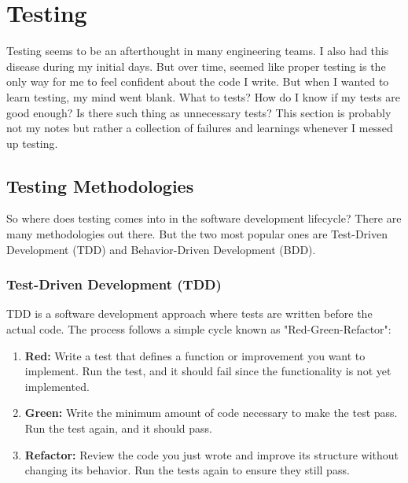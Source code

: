 \section{Testing}
Testing seems to be an afterthought in many engineering teams. I also had this disease during my initial days. But over time, seemed like proper testing is the only way for me to feel confident about the code I write. But when I wanted to learn testing, my mind went blank. What to tests? How do I know if my tests are good enough? Is there such thing as unnecessary tests? This section is probably not my notes but rather a collection of failures and learnings whenever I messed up testing.

\subsection{Testing Methodologies}
So where does testing comes into in the software development lifecycle? There are many methodologies out there. But the two most popular ones are Test-Driven Development (TDD) and Behavior-Driven Development (BDD). 

\subsubsection{Test-Driven Development (TDD)}
TDD is a software development approach where tests are written before the actual code. The process follows a simple cycle known as "Red-Green-Refactor":
\begin{enumerate}
    \item \textbf{Red:} Write a test that defines a function or improvement you want to implement. Run the test, and it should fail since the functionality is not yet implemented.
    \item \textbf{Green:} Write the minimum amount of code necessary to make the test pass. Run the test again, and it should pass.
    \item \textbf{Refactor:} Review the code you just wrote and improve its structure without changing its behavior. Run the tests again to ensure they still pass.
\end{enumerate}
